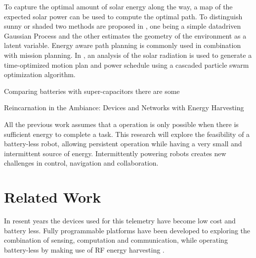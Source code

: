 \documentclass[letterpaper, 10 pt, conference]{ieeeconf}  %
\begin{document}

To capture the optimal amount of solar energy along the way, a map of the expected solar power can be used to compute the optimal path. To distinguish sunny or shaded two methods are proposed in \cite{plonski_tranro_2016}, one being a simple datadriven Gaussian Process and the other estimates the geometry of the environment as a latent variable.
Energy aware path planning is commonly used in combination with mission planning.
In \cite{kaplan_iros_2016}, an analysis of the solar radiation is used to generate a time-optimized motion plan and power schedule using a cascaded particle swarm optimization algorithm.




Comparing batteries with super-capacitors there are some 


Reincarnation in the Ambiance: Devices and Networks with Energy Harvesting \cite{prasad_comst_2014}




% 

All the previous work assumes that a operation is only possible when there is sufficient energy to complete a task. 
This research will explore the feasibility of a battery-less robot, allowing persistent operation while having a very small and intermittent source of energy.
Intermittently powering robots creates new challenges in control, navigation and collaboration.

\section{Related Work}

In resent years the devices used for this telemetry have become low cost and battery less.
Fully programmable platforms have been developed to exploring the combination of sensing, computation and communication, while operating battery-less by making use of RF energy harvesting \cite{WISPPAPER}.
\end{document}
